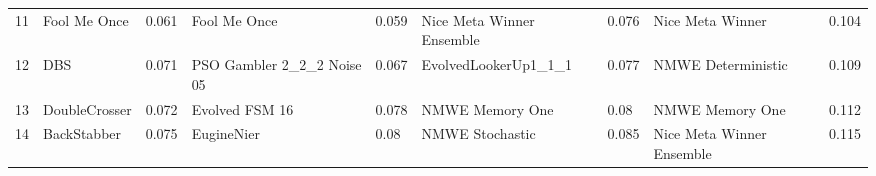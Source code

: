 \begin{tabular}{lllllllll}
11 &             Fool Me Once &     0.061 &                Fool Me Once &     0.059 &  Nice Meta Winner Ensemble &     0.076 &           Nice Meta Winner &     0.104 \\
12 &                      DBS &     0.071 &  PSO Gambler 2\_2\_2 Noise 05 &     0.067 &       EvolvedLookerUp1\_1\_1 &     0.077 &         NMWE Deterministic &     0.109 \\
13 &            DoubleCrosser &     0.072 &              Evolved FSM 16 &     0.078 &            NMWE Memory One &      0.08 &            NMWE Memory One &     0.112 \\
14 &              BackStabber &     0.075 &                  EugineNier &      0.08 &            NMWE Stochastic &     0.085 &  Nice Meta Winner Ensemble &     0.115 \\
\bottomrule
\end{tabular}
